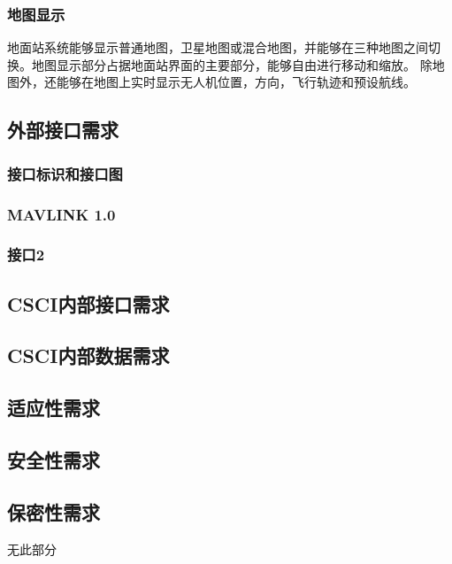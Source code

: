 \subsubsection{地图显示}
地面站系统能够显示普通地图，卫星地图或混合地图，并能够在三种地图之间切换。地图显示部分占据地面站界面的主要部分，能够自由进行移动和缩放。
除地图外，还能够在地图上实时显示无人机位置，方向，飞行轨迹和预设航线。

\subsubsection{}

\subsection{外部接口需求}

\subsubsection{接口标识和接口图}

\subsubsection{MAVLINK 1.0}


\subsubsection{接口2}

\subsection{CSCI内部接口需求}

\subsection{CSCI内部数据需求}

\subsection{适应性需求}

\subsection{安全性需求}

\subsection{保密性需求}
无此部分


